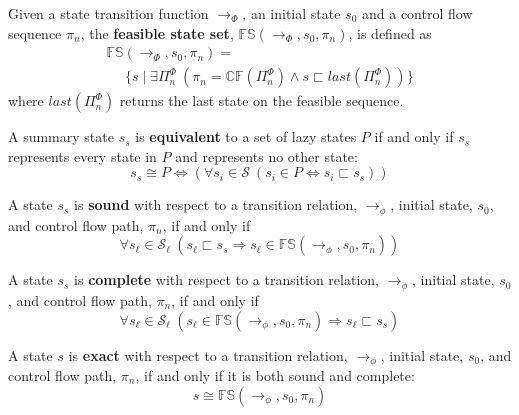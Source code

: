 \begin{definition}
Given a state transition function $\rightarrow_{\Phi}$, an initial state $s_0$ and a control flow sequence $\pi_n$, the \textbf{feasible state set}, $\mathbb{FS}(\rightarrow_{\Phi},s_0,\pi_n)$, is defined as
 $$
\begin{array}{l}
\mathbb{FS}(\rightarrow_{\Phi},s_0,\pi_n) = \\
\ \ \ \ \ \ \{s \mid \exists \Pi_n^\Phi\ (\pi_n = \mathbb{CF}(\Pi_n^\Phi) \wedge s \sqsubset \mathit{last}(\Pi_n^\Phi))\} 
\end{array}
$$
where $\mathit{last}(\Pi_n^\Phi)$ returns the last state on the feasible sequence.
\end{definition}

\begin{definition}
\label{equivalent}
A summary state $s_s$ is \textbf{equivalent} to a set of lazy states $P$ if and only if $s_s$ represents every state in $P$ and represents no other state: 
$$s_s \cong P \Leftrightarrow (\forall s_i \in \mathcal{S}\ (s_i \in P \Leftrightarrow s_i \sqsubset s_s) )$$
\end{definition}

\begin{definition}
\label{sound}
A state $s_s$ is \textbf{sound} with respect to a transition relation, $\rightarrow_\phi$, initial state, $s_0$, and control flow path, $\pi_n$, if and only if 
$$ \forall s_\ell \in \mathcal{S}_\ell\ (s_\ell \sqsubset s_s \Rightarrow s_\ell \in \mathbb{FS}(\rightarrow_{\phi},s_0,\pi_n) ) $$
\end{definition}

\begin{definition}
\label{complete}
A state $s_s$ is \textbf{complete} with respect to a transition relation, $\rightarrow_\phi$, initial state, $s_0$, and control flow path, $\pi_n$, if and only if 
$$ \forall s_\ell \in \mathcal{S}_\ell\ ( s_\ell \in \mathbb{FS}(\rightarrow_{\phi},s_0,\pi_n)\Rightarrow s_\ell \sqsubset s_s ) $$
\end{definition}

\begin{definition}
\label{exact}
A state $s$ is \textbf{exact} with respect to a transition relation, $\rightarrow_\phi$, initial state, $s_0$, and control flow path, $\pi_n$, if and only if it is both sound and complete:
$$ s \cong \mathbb{FS}(\rightarrow_{\phi},s_0,\pi_n)$$
\end{definition}

